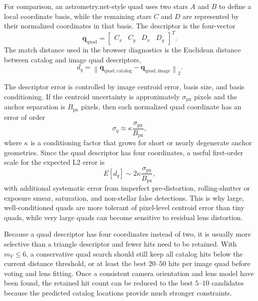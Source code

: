 \documentclass[11pt]{article}
\begin{document}
For comparison, an astrometry.net-style quad uses two stars \(A\) and \(B\) to
define a local coordinate basis, while the remaining stars \(C\) and \(D\) are
represented by their normalized coordinates in that basis. The descriptor is
the four-vector
\begin{equation}
  \mathbf{q}_{\mathrm{quad}} =
  \begin{bmatrix}
    C_x & C_y & D_x & D_y
  \end{bmatrix}^{T}.
\end{equation}
The match distance used in the browser diagnostics is the Euclidean distance
between catalog and image quad descriptors,
\begin{equation}
  d_q =
  \left\lVert
    \mathbf{q}_{\mathrm{quad,catalog}} -
    \mathbf{q}_{\mathrm{quad,image}}
  \right\rVert_2 .
\end{equation}

The descriptor error is controlled by image centroid error, basis size, and
basis conditioning. If the centroid uncertainty is approximately
\(\sigma_{\mathrm{px}}\) pixels and the anchor separation is
\(B_{\mathrm{px}}\) pixels, then each normalized quad coordinate has an error
of order
\begin{equation}
  \sigma_q \approx \kappa \frac{\sigma_{\mathrm{px}}}{B_{\mathrm{px}}},
\end{equation}
where \(\kappa\) is a conditioning factor that grows for short or nearly
degenerate anchor geometries. Since the quad descriptor has four coordinates,
a useful first-order scale for the expected L2 error is
\begin{equation}
  E[d_q] \sim 2\kappa \frac{\sigma_{\mathrm{px}}}{B_{\mathrm{px}}},
\end{equation}
with additional systematic error from imperfect pre-distortion, rolling-shutter
or exposure smear, saturation, and non-stellar false detections. This is why
large, well-conditioned quads are more tolerant of pixel-level centroid error
than tiny quads, while very large quads can become sensitive to residual lens
distortion.

Because a quad descriptor has four coordinates instead of two, it is usually
more selective than a triangle descriptor and fewer hits need to be retained.
With \(m_V\le6\), a conservative quad search should still keep all catalog hits
below the current distance threshold, or at least the best \(20\)--\(50\) hits
per image quad before voting and lens fitting. Once a consistent camera
orientation and lens model have been found, the retained hit count can be
reduced to the best \(5\)--\(10\) candidates because the predicted catalog
locations provide much stronger constraints.
\end{document}
